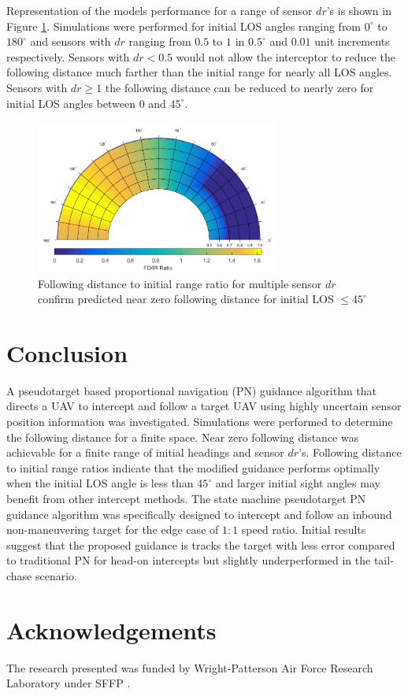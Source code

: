 \documentclass[conference]{IEEEtran}
\begin{document}
Representation of the models performance for a range of sensor $dr$'s is shown in Figure \ref{fig:Polar}. Simulations were performed for initial LOS angles ranging from $0^{\circ}$ to $180^{\circ}$ and sensors with $dr$ ranging from $0.5$ to $1$ in $0.5^{\circ}$ and $0.01$ unit increments respectively. Sensors with $dr < 0.5$ would not allow the interceptor to reduce the following distance much farther than the initial range for nearly all LOS angles. Sensors with $dr \geq 1$ the following distance can be reduced to nearly zero for initial LOS angles between $0$ and $45^{\circ}$. 

\begin{figure}[H]
	\centering
	\includegraphics[width=8cm]{correctpolar.png}
	\caption{Following distance to initial range ratio for multiple sensor $dr$ confirm predicted near zero following distance for initial LOS $\leq45^\circ$}
	\label{fig:Polar}
\end{figure}

\section{Conclusion}



A pseudotarget based proportional navigation (PN) guidance algorithm that directs a UAV to intercept and follow a target UAV using highly uncertain sensor position information was investigated. Simulations were performed to determine the following distance for a finite space. Near zero following distance was achievable for a finite range of initial headings and sensor $dr$'s. Following distance to initial range ratios indicate that the modified guidance performs optimally when the initial LOS angle is less than $45^\circ$ and larger initial sight angles may benefit from other intercept methods. The state machine pseudotarget PN guidance algorithm was specifically designed to intercept and follow an inbound non-maneuvering target for the edge case of $1:1$ speed ratio. Initial results suggest that the proposed guidance is tracks the target with less error compared to traditional PN for head-on intercepts but slightly underperformed in the tail-chase scenario.




\section{Acknowledgements}
The research presented was funded by Wright-Patterson Air Force Research Laboratory under SFFP . 





\end{document}
